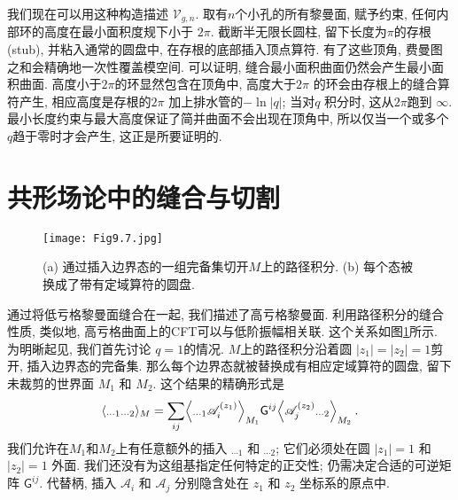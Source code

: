 我们现在可以用这种构造描述 $\mathscr{V}_{g, n}$. 取有$n$个小孔的所有黎曼面, 赋予约束, 任何内部环的高度在最小面积度规下小于 $2 \pi $. 
截断半无限长圆柱, 留下长度为$\pi$的存根(stub), 并粘入通常的圆盘中, 在存根的底部插入顶点算符. 有了这些顶角, 费曼图之和会精确地一次性覆盖模空间. 
可以证明, 缝合最小面积曲面仍然会产生最小面积曲面. 高度小于$2 \pi$的环显然包含在顶角中, 高度大于$2 \pi$ 的环会由存根上的缝合算符产生, 
相应高度是存根的$2 \pi$ 加上排水管的$-\ln |q|$; 当对$q$ 积分时, 这从$2 \pi$跑到 $\infty$. 最小长度约束与最大高度保证了简并曲面不会出现在顶角中, 
所以仅当一个或多个$q$趋于零时才会产生, 这正是所要证明的.

\section{共形场论中的缝合与切割} \label{sec:9.4}%



\begin{figure}
	\begin{center}
		\texttt{[image: Fig9.7.jpg]}\\
		\caption{(a) 通过插入边界态的一组完备集切开$M$上的路径积分. (b) 每个态被换成了带有定域算符的圆盘.}\label{Fig9.7}
	\end{center}
\end{figure}

通过将低亏格黎曼面缝合在一起, 我们描述了高亏格黎曼面. 利用路径积分的缝合性质, 类似地, 高亏格曲面上的CFT可以与低阶振幅相关联. 这个关系如图\ref{Fig9.7}所示.
为明晰起见, 我们首先讨论 $q=1 $的情况. $M$上的路径积分沿着圆 $|z_{1}|=|z_{2}|=1$剪开, 插入边界态的完备集. 那么每个边界态就被替换成有相应定域算符的圆盘, 
留下未裁剪的世界面 $M_{1}$ 和 $M_{2}$. 这个结果的精确形式是
\begin{equation}
	\langle {}_{\cdots 1} {}_{\cdots 2}\rangle_{M} = \sum_{i j}\Bigl \langle {}_{\cdots 1} \mathscr{A}_{i}^{(z_{1})}\Bigr\rangle_{M_{1}} 
	\mathsf{G}^{ij} \Bigl\langle\mathscr{A}_{j}^{(z_{2})} {}_{\cdots 2}\Bigr\rangle_{M_{2}} \:. \label{9.4.1}
\end{equation}
我们允许在$M_{1}$和$M_{2}$上有任意额外的插入 ${}_{\cdots 1}$ 和 ${}_{\cdots 2}$; 它们必须处在圆 $|z_{1}|=1$ 和$|z_{2}|=1$ 外面. 
我们还没有为这组基指定任何特定的正交性; 仍需决定合适的可逆矩阵 $\mathsf{G}^{i j}$. 代替柄, 插入 $\mathscr{A}_{i}$ 和 $\mathscr{A}_{j}$
分别隐含处在 $z_{1}$ 和 $z_{2}$ 坐标系的原点中.

